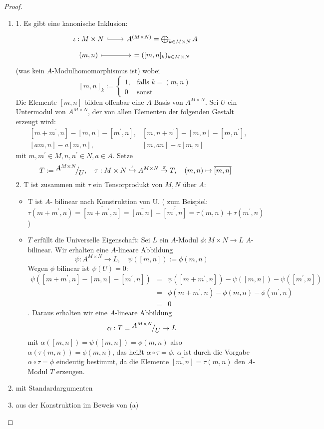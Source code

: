\begin{proof} 
	\begin{enumerate} [label= \alph*)]
		\item 1. Es gibt eine kanonische Inklusion:
		$$\begin{tikzcd}[row sep = tiny]
			\iota: M \times N\arrow[hook]{r} & A^{(M \times N)} = \bigoplus_{k\in M \times N} A	\\
			(m,n) \arrow[mapsto]{r} & [m,n] = ([m,n]_k)_{k\in M\times N}	
		\end{tikzcd}$$
		(was kein $A$-Modulhomomorphismus ist) wobei 
		$$[m,n]_k:= \begin{cases}
		1, & \text{falls } k=(m,n) \\0 & \text{sonst}
		\end{cases}$$
		Die Elemente $[m,n] $ bilden offenbar eine $A$-Basis von $A^{M \times N } $. Sei $U$ ein Untermodul von $A^{M \times N }$, der von allen Elementen der folgenden Gestalt erzeugt wird: 
		\begin{align*}
		 &[m + m^{'}, n] - [m,n] - [m^{'}, n], &[m, n + n^{'}] - [m,n] -[m,n^{'}], \\
		 &[am,n] -a[m,n],& [m,an] -a[m,n]
		\end{align*} mit $m,m^{'} \in M, n,n^{'} \in N, a\in A.$ Setze $$T:= \QR{A^{M \times N}}{U}, \quad \tau: M \times N \overset{\iota}{\hookrightarrow} A^{M \times N} \overset{\pi}{\to} T,\quad  (m,n) \mapsto \bar{[m,n]}$$ 
		2. T ist zusammen mit $\tau$ ein Tensorprodukt von $M,N$ über $A$: 
		\begin{itemize}
			\item T ist $A$- bilinear nach Konstruktion von U. ( zum Beispiel: $\tau(m +m^{'},n) = \bar{[m +m^{'},n]} = \bar{[m,n]} + \bar{[m^{'},n]} = \tau(m,n) + \tau(m^{'},n)$)
			\item $T$ erfüllt die Universelle Eigenschaft: Sei $L$ ein $A$-Modul $\phi: M \times N \to L $ $A$-bilinear. Wir erhalten eine $A$-lineare Abbildung $$\psi: A^{M \times N } \to L, \quad \psi([m,n]) := \phi(m,n)$$ Wegen $\phi$ bilinear ist $\psi(U) = 0:$
			\begin{eqnarray*} \psi( [m + m^{'}, n] - [m,n] - [m^{'}, n]) &=& \psi([m + m^{'}, n]) -\psi([m,n]) - \psi([m^{'}, n])\\
				& =& \phi(m + m^{'}, n) -\phi(m,n) -\phi(m^{'}, n) \\
				&=& 0 \end{eqnarray*}. Daraus erhalten wir eine $A$-lineare Abbildung $$ \alpha: T = \QR{A^{M \times N}}{U} \to L $$ mit $\alpha([m,n]) = \psi([m,n]) = \phi(m,n)$ also $\alpha(\tau(m,n)) = \phi(m,n)$, das heißt $\alpha \circ \tau = \phi $. $\alpha $ ist durch die Vorgabe $\alpha \circ \tau = \phi $ eindeutig bestimmt, da die Elemente $ \bar{[m,n]} = \tau(m,n) $ den $A$-Modul $T$ erzeugen. 
		\end{itemize}
		\item mit Standardargumenten 
		\item aus der Konstruktion im Beweis von (a)
	\end{enumerate}
\end{proof}
